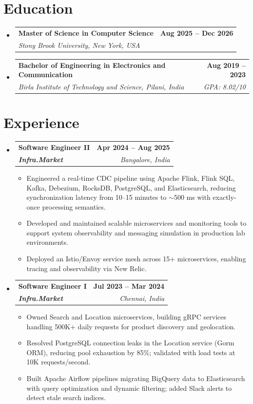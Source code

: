 \documentclass[letterpaper,11pt]{article}
\makeatletter
\newcommand{\resumeItem}[1]{
  \item\small{
    {#1 \vspace{-2pt}}
  }
}
\newcommand{\resumeSubheading}[4]{
  \vspace{-2pt}\item
    \begin{tabular*}{1.0\textwidth}[t]{l@{\extracolsep{\fill}}r}
      \textbf{#1} & \textbf{\small #2} \\
      \textit{\small#3} & \textit{\small #4} \\
    \end{tabular*}\vspace{-7pt}
}
\newcommand{\resumeSubHeadingListStart}{\begin{itemize}[leftmargin=0.0in, label={}]}
\newcommand{\resumeSubHeadingListEnd}{\end{itemize}}
\newcommand{\resumeItemListStart}{\begin{itemize}}
\newcommand{\resumeItemListEnd}{\end{itemize}\vspace{-5pt}}
\makeatother
\begin{document}
\section{Education}
  \resumeSubHeadingListStart
    \resumeSubheading
      {Master of Science in Computer Science}{Aug 2025 -- Dec 2026}
      {Stony Brook University, New York, USA}{}
    \resumeSubheading
      {Bachelor of Engineering in Electronics and Communication}{Aug 2019 -- 2023}
      {Birla Institute of Technology and Science, Pilani, India}{GPA: 8.02/10}
  \resumeSubHeadingListEnd
\vspace{-12pt}

\section{Experience}
  \resumeSubHeadingListStart

    \resumeSubheading
      {\textbf{Software Engineer II}}{\textbf{Apr 2024 -- Aug 2025}}
      {\textbf{Infra.Market}}{Bangalore, India}
      \resumeItemListStart
        \resumeItem{Engineered a real-time CDC pipeline using Apache Flink, Flink SQL, Kafka, Debezium, RocksDB, PostgreSQL, and Elasticsearch, reducing synchronization latency from 10--15 minutes to $\sim$500 ms with exactly-once processing semantics.}
        \resumeItem{Developed and maintained scalable microservices and monitoring tools to support system observability and messaging simulation in production lab environments.}
        \resumeItem{Deployed an Istio/Envoy service mesh across 15+ microservices, enabling tracing and observability via New Relic.}
      \resumeItemListEnd

    \resumeSubheading
      {\textbf{Software Engineer I}}{\textbf{Jul 2023 -- Mar 2024}}
      {\textbf{Infra.Market}}{Chennai, India}
      \resumeItemListStart
        \resumeItem{Owned Search and Location microservices, building gRPC services handling 500K+ daily requests for product discovery and geolocation.}
        \resumeItem{Resolved PostgreSQL connection leaks in the Location service (Gorm ORM), reducing pool exhaustion by 85\%; validated with load tests at 10K requests/second.}
        \resumeItem{Built Apache Airflow pipelines migrating BigQuery data to Elasticsearch with query optimization and dynamic filtering; added Slack alerts to detect stale search indices.}
      \resumeItemListEnd

  \resumeSubHeadingListEnd
\vspace{-12pt}
\end{document}
